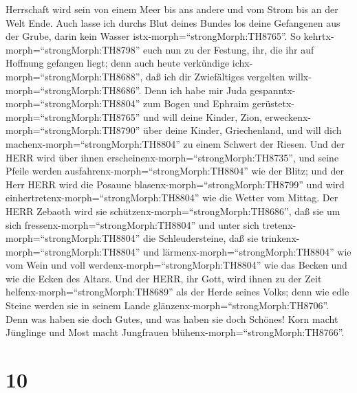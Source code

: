 Herrschaft wird sein von einem Meer bis ans andere und vom Strom bis an
der Welt Ende.  Auch lasse ich durchs Blut deines Bundes
los deine Gefangenen aus der Grube, darin kein Wasser
istx-morph=``strongMorph:TH8765''.  So
kehrtx-morph=``strongMorph:TH8798'' euch nun zu der Festung, ihr, die
ihr auf Hoffnung gefangen liegt; denn auch heute verkündige
ichx-morph=``strongMorph:TH8688'', daß ich dir Zwiefältiges vergelten
willx-morph=``strongMorph:TH8686''.  Denn ich habe mir Juda
gespanntx-morph=``strongMorph:TH8804'' zum Bogen und Ephraim
gerüstetx-morph=``strongMorph:TH8765'' und will deine Kinder, Zion,
erweckenx-morph=``strongMorph:TH8790'' über deine Kinder, Griechenland,
und will dich machenx-morph=``strongMorph:TH8804'' zu einem Schwert der
Riesen.  Und der HERR wird über ihnen
erscheinenx-morph=``strongMorph:TH8735'', und seine Pfeile werden
ausfahrenx-morph=``strongMorph:TH8804'' wie der Blitz; und der Herr HERR
wird die Posaune blasenx-morph=``strongMorph:TH8799'' und wird
einhertretenx-morph=``strongMorph:TH8804'' wie die Wetter vom Mittag.
 Der HERR Zebaoth wird sie
schützenx-morph=``strongMorph:TH8686'', daß sie um sich
fressenx-morph=``strongMorph:TH8804'' und unter sich
tretenx-morph=``strongMorph:TH8804'' die Schleudersteine, daß sie
trinkenx-morph=``strongMorph:TH8804'' und
lärmenx-morph=``strongMorph:TH8804'' wie vom Wein und voll
werdenx-morph=``strongMorph:TH8804'' wie das Becken und wie die Ecken
des Altars.  Und der HERR, ihr Gott, wird ihnen zu der Zeit
helfenx-morph=``strongMorph:TH8689'' als der Herde seines Volks; denn
wie edle Steine werden sie in seinem Lande
glänzenx-morph=``strongMorph:TH8706''.  Denn was haben sie
doch Gutes, und was haben sie doch Schönes! Korn macht Jünglinge und
Most macht Jungfrauen blühenx-morph=``strongMorph:TH8766''.

\hypertarget{section-9}{%
\section{10}\label{section-9}}

